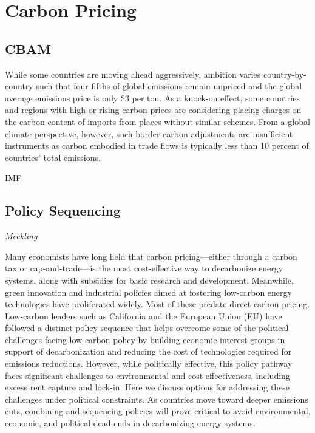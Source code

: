 \documentclass[
]{book}
\begin{document}
\hypertarget{carbon-pricing}{%
\chapter{Carbon Pricing}\label{carbon-pricing}}

\hypertarget{cbam}{%
\section{CBAM}\label{cbam}}

While some countries are moving ahead aggressively, ambition varies country-by-country such that four-fifths of global emissions remain unpriced and the global average emissions price is only \$3 per ton. As a knock-on effect, some countries and regions with high or rising carbon prices are considering placing charges on the carbon content of imports from places without similar schemes. From a global climate perspective, however, such border carbon adjustments are insufficient instruments as carbon embodied in trade flows is typically less than 10 percent of countries' total emissions.

\href{https://blogs.imf.org/2021/06/18/a-proposal-to-scale-up-global-carbon-pricing/}{IMF}

\hypertarget{policy-sequencing}{%
\section{Policy Sequencing}\label{policy-sequencing}}

\emph{Meckling}

Many economists have long held that carbon pricing---either through a carbon tax or cap-and-trade---is the most cost-effective way to decarbonize energy systems, along with subsidies for basic research and development. Meanwhile, green innovation and industrial policies aimed at fostering low-carbon energy technologies have proliferated widely. Most of these predate direct carbon pricing. Low-carbon leaders such as California and the European Union (EU) have followed a distinct policy sequence that helps overcome some of the political challenges facing low-carbon policy by building economic interest groups in support of decarbonization and reducing the cost of technologies required for emissions reductions. However, while politically effective, this policy pathway faces significant challenges to environmental and cost effectiveness, including excess rent capture and lock-in. Here we discuss options for addressing these challenges under political constraints. As countries move toward deeper emissions cuts, combining and sequencing policies will prove critical to avoid environmental, economic, and political dead-ends in decarbonizing energy systems.
\end{document}
